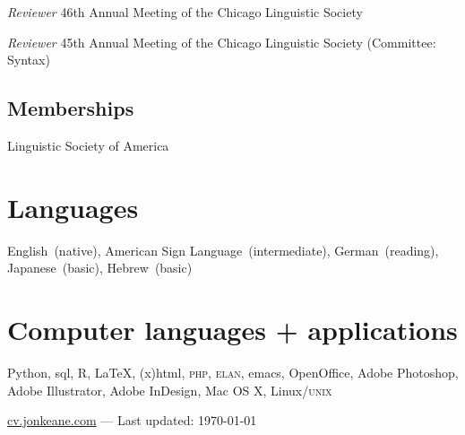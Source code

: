 \documentclass[10pt, letterpaper]{article}
\newcommand{\years}[1]{\marginpar{\scriptsize #1}}
\begin{document}
\-\years{2010}\textit{Reviewer} 46th Annual Meeting of the Chicago Linguistic Society

\-\years{2009}\textit{Reviewer} 45th Annual Meeting of the Chicago Linguistic Society (Committee: Syntax)

\subsection*{Memberships}
\label{sec:memberships}
\-\years{2008--}Linguistic Society of America

\section*{Languages}
\label{sec:languages}
English~(native), American Sign Language~(intermediate), German~(reading), Japanese~(basic), Hebrew~(basic)

\section*{Computer languages + applications}
\label{sec:computer}
Python, {\sc sql}, R, \LaTeX, {\sc (x)html}, \textsc{php}, \textsc{elan}, emacs, OpenOffice, Adobe Photoshop, Adobe Illustrator, Adobe InDesign, Mac OS X, Linux/\textsc{unix}

\vfill{}
\hrulefill
\begin{center}
{\footnotesize \href{http://cv.jonkeane.com}{cv.jonkeane.com} — Last updated: \isodate\today}
\end{center}
\end{document}
